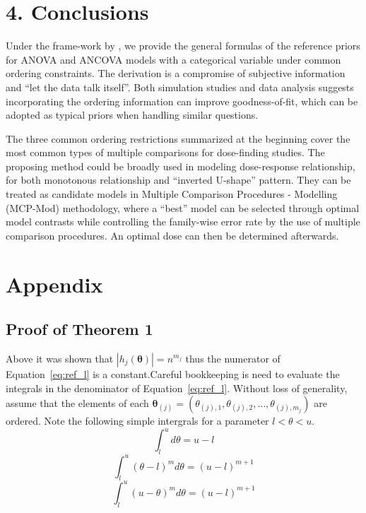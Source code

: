 \documentclass[Proceedings]{ascelike}
\begin{document}
\section{4. Conclusions}
Under the frame-work by \cite{BergerBernardo1992}, we provide the
general formulas of the reference priors for ANOVA and ANCOVA models
with a categorical variable under common ordering constraints. The
derivation is a compromise of subjective information and ``let the
data talk itself''. Both simulation studies and data analysis suggests
incorporating the ordering information can improve goodness-of-fit,
which can be adopted as typical priors when handling similar
questions.

The three common ordering restrictions summarized at the beginning
cover the most common types of multiple comparisons for dose-finding
studies. The proposing method could be broadly used in modeling
dose-response relationship, for both monotonous relationship and
``inverted U-shape'' pattern. They can be treated as candidate models
in Multiple Comparison Procedures - Modelling (MCP-Mod) methodology,
where a ``best'' model can be selected through optimal model contrasts
while controlling the family-wise error rate by the use of multiple
comparison procedures. An optimal dose can then be determined
afterwards.

\pagebreak
%
%
%
\section*{Appendix}

\subsection*{Proof of Theorem 1}

Above it was shown that $|h_j(\boldsymbol{\theta})|=n^{m_j}$ thus the
numerator of Equation~\eqref{eq:ref_l} is a constant.Careful bookkeeping
is need to evaluate the integrals in the denominator of
Equation~\eqref{eq:ref_l}. Without loss of generality, assume that the
elements of each $\boldsymbol{\theta}_{(j)}=(\theta_{(j),1},
\theta_{(j),2}, \ldots, \theta_{(j),m_j})$ are ordered. Note the
following simple intergrals for a parameter $l<\theta<u$.
\[
\int_l^u d\theta = u-l
\]
\[
\int_l^u (\theta-l)^m d\theta = (u-l)^{m+1}
\]
\[
\int_l^u (u-\theta)^m d\theta = (u-l)^{m+1}
\]
\end{document}
